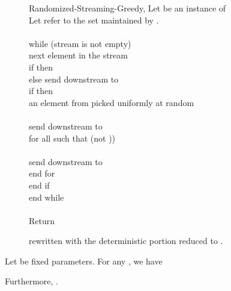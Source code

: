 \documentclass[oneside,letterpaper]{scrartcl} \usepackage{macros}
\begin{document}
\begin{figure}[t]
  \centering
  \begin{minipage}{13.2cm}
    \begin{framed}
      \begin{pseudocode}
        \begin{routine}{Randomized-Streaming-Greedy}{,} Let  be an instance of \alpha\beta \\
          Let  refer to the set  maintained by . \\
           \\
          while (stream is not empty) \\
          \>  next element in the stream \\
          \> if  then 
          \\
          \> else send  downstream to 
          \\
          \> if  then \\
          \> \>  an element from  picked uniformly
          at random \\
          \> \> \\
          \> \> send  downstream to  \\
          \> \> for all  such that (not ))\\
          \> \> \> \\
          \> \> \> send  downstream to  \\
          \> \> end for \\
          \> end if\\
          end while\\
          \buffer\\
          Return 
        \end{routine}
      \end{pseudocode}
    \end{framed}
    \caption{ rewritten with the
      deterministic portion reduced to .}
  \end{minipage}
\end{figure}


\begin{lemma}
  Let  be fixed parameters. For any , we have
  
  Furthermore, .
\end{lemma}
\end{document}
